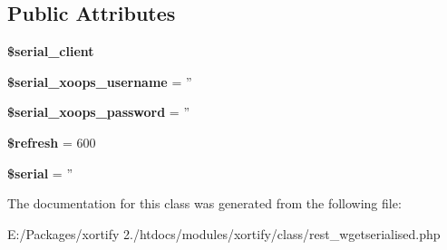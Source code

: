 \subsection*{Public Attributes}
\begin{DoxyCompactItemize}
\item 
\hypertarget{class_r_e_s_t___w_g_e_t_s_e_r_i_a_l_i_s_e_d_xortify_exchange_aa528598a1ca389ab47b1ff219230e423}{{\bfseries \$serial\-\_\-client}}\label{class_r_e_s_t___w_g_e_t_s_e_r_i_a_l_i_s_e_d_xortify_exchange_aa528598a1ca389ab47b1ff219230e423}

\item 
\hypertarget{class_r_e_s_t___w_g_e_t_s_e_r_i_a_l_i_s_e_d_xortify_exchange_af0fe4bb90e809119f4924c2bb94dd267}{{\bfseries \$serial\-\_\-xoops\-\_\-username} = ''}\label{class_r_e_s_t___w_g_e_t_s_e_r_i_a_l_i_s_e_d_xortify_exchange_af0fe4bb90e809119f4924c2bb94dd267}

\item 
\hypertarget{class_r_e_s_t___w_g_e_t_s_e_r_i_a_l_i_s_e_d_xortify_exchange_aef2783630d5b291f971c886265179a78}{{\bfseries \$serial\-\_\-xoops\-\_\-password} = ''}\label{class_r_e_s_t___w_g_e_t_s_e_r_i_a_l_i_s_e_d_xortify_exchange_aef2783630d5b291f971c886265179a78}

\item 
\hypertarget{class_r_e_s_t___w_g_e_t_s_e_r_i_a_l_i_s_e_d_xortify_exchange_a0a8e3a3697929e52519076f9f19b5caf}{{\bfseries \$refresh} = 600}\label{class_r_e_s_t___w_g_e_t_s_e_r_i_a_l_i_s_e_d_xortify_exchange_a0a8e3a3697929e52519076f9f19b5caf}

\item 
\hypertarget{class_r_e_s_t___w_g_e_t_s_e_r_i_a_l_i_s_e_d_xortify_exchange_aca23b48462d5f0fad64ef682b0755e9c}{{\bfseries \$serial} = ''}\label{class_r_e_s_t___w_g_e_t_s_e_r_i_a_l_i_s_e_d_xortify_exchange_aca23b48462d5f0fad64ef682b0755e9c}

\end{DoxyCompactItemize}


The documentation for this class was generated from the following file\-:\begin{DoxyCompactItemize}
\item 
E\-:/\-Packages/xortify 2./htdocs/modules/xortify/class/rest\-\_\-wgetserialised.\-php\end{DoxyCompactItemize}
